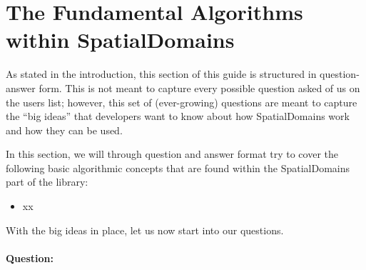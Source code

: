 %
\section{The Fundamental Algorithms within SpatialDomains}

As stated in the introduction, this section of this guide is structured in question-answer form.  This is not meant to capture every possible
question asked of us on the {\nek} users list; however, this set of (ever-growing) questions are meant to capture the ``big ideas'' that developers 
want to know about how SpatialDomains work and how they can be used.  

In this section, we will through question and answer format try to cover the following basic algorithmic concepts that are found within 
the SpatialDomains part of the library:

\begin{itemize}
\item xx
\end{itemize}

With the big ideas in place, let us now start into our questions.

\paragraph{Question:}
